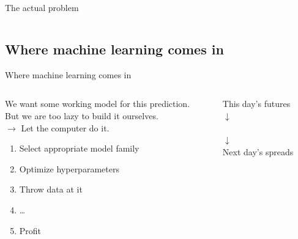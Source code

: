 \documentclass{beamer}
\begin{document}
\begin{frame}{The actual problem}
\begin{columns}
\begin{column}{0.5\linewidth}
		\end{column}
	\end{columns}
\end{frame}

\subsection{Where machine learning comes in}
\begin{frame}{Where machine learning comes in}
\begin{columns}
	\begin{column}{0.65\linewidth}
		We want some working model for this prediction. \\
		But we are too lazy to build it ourselves. \\
		$\rightarrow$ Let the computer do it.
		\\
		\begin{enumerate}
			\item Select appropriate model family
			\item Optimize hyperparameters
			\item Throw data at it
			\item \dots
			\item Profit
		\end{enumerate}
	\end{column}
	\begin{column}{0.3\linewidth}
		\centering
		This day's futures \\
		$\downarrow$ \\
		 \\
		$\downarrow$ \\
		Next day's spreads
	\end{column}
\end{columns}
\end{frame}
\end{document}
